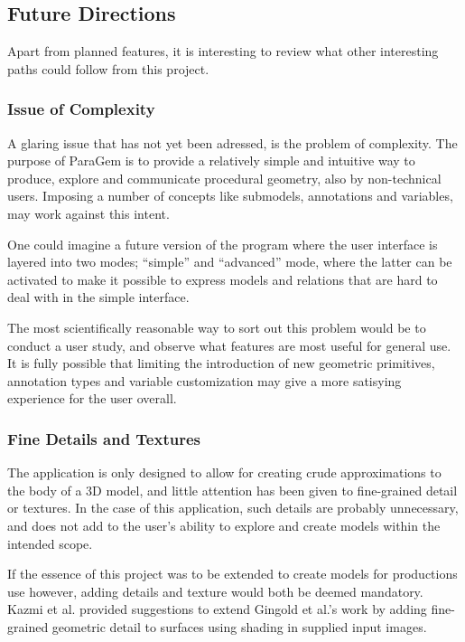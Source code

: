 \documentclass[english]{article}
\begin{document}
\subsection{Future Directions}

Apart from planned features, it is interesting to review what other interesting paths could follow from this project.

\subsubsection{Issue of Complexity}

A glaring issue that has not yet been adressed, is the problem of complexity. The purpose of ParaGem is to provide a relatively simple and intuitive way to produce, explore and communicate procedural geometry, also by non-technical users. Imposing a number of concepts like submodels, annotations and variables, may work against this intent.

One could imagine a future version of the program where the user interface is layered into two modes; ``simple'' and ``advanced'' mode, where the latter can be activated to make it possible to express models and relations that are hard to deal with in the simple interface.

The most scientifically reasonable way to sort out this problem would be to conduct a user study, and observe what features are most useful for general use. It is fully possible that limiting the introduction of new geometric primitives, annotation types and variable customization may give a more satisying experience for the user overall.

\subsubsection{Fine Details and Textures}

The application is only designed to allow for creating crude approximations to the body of a 3D model, and little attention has been given to fine-grained detail or textures. In the case of this application, such details are probably unnecessary, and does not add to the user's ability to explore and create models within the intended scope.

If the essence of this project was to be extended to create models for productions use however, adding details and texture would both be deemed mandatory. Kazmi et al. \cite{hybrid_character_modeling} provided suggestions to extend Gingold et al.'s work by adding fine-grained geometric detail to surfaces using shading in supplied input images.
\end{document}
